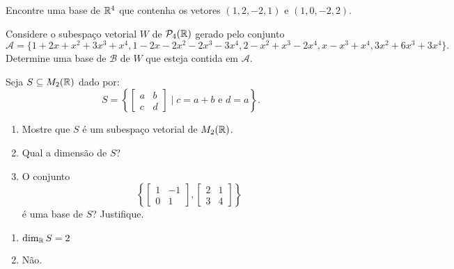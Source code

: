 \documentclass[12pt]{exam}
\begin{document}
    \begin{exercicio}
        Encontre uma base de $\mathbb{R}^4$ que contenha os vetores $(1,2,-2,1)$ e $(1,0,-2,2)$.
    \end{exercicio}

    \begin{exercicio}
        Considere o subespa\c{c}o vetorial $W$ de $\mathcal{P}_4(\mathbb{R})$ gerado pelo conjunto
        \[
            \mathcal{A} = \{1+2x+x^2+3x^3+x^4, 1-2x-2x^2-2x^3-3x^4,2-x^2+x^3-2x^4,x-x^3+x^4,3x^2+6x^3+3x^4\}.
        \]
        Determine uma base de $\mathcal{B}$ de $W$ que esteja contida em $\mathcal{A}$.
    \end{exercicio}

    \begin{exercicio}
        Seja $S \subseteq M_2(\mathbb{R})$ dado por:
        \[
            S = \left\{
                \begin{bmatrix}
                    a & b\\
                    c & d
                \end{bmatrix}
                \mid c = a+b \mbox{ e } d = a
            \right\}.
        \]

        \begin{enumerate}[label={\alph*})]
            \item Mostre que $S$ \'e um subespa\c{c}o vetorial de $M_2(\mathbb{R})$.

            \item Qual a dimens\~ao de $S$?

            \item O conjunto
                \[
                    \left\{
                        \begin{bmatrix}
                            1 & -1\\
                            0 & 1
                        \end{bmatrix},
                        \begin{bmatrix}
                            2 & 1\\
                            3 & 4
                        \end{bmatrix}
                    \right\}
                \]
                \'e uma base de $S$? Justifique.
        \end{enumerate}

        \begin{solucao}
            \begin{enumerate}[label={\alph*})]
                \item $\dim_{\mathbb{R}} S = 2$

                \item N\~ao.
            \end{enumerate}
        \end{solucao}
    \end{exercicio}
\end{document}
